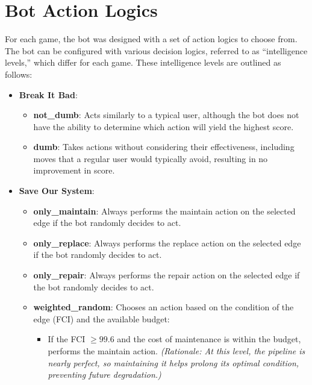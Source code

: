 \documentclass[12pt,a4paper]{report}
\begin{document}
    \section{Bot Action Logics}
    \label{sec:bot-action-logics}
        For each game, the bot was designed with a set of action logics to choose from. The bot can be configured with various decision logics, referred to as “intelligence levels,” which differ for each game. These intelligence levels are outlined as follows:
        
        \begin{itemize}
            \item \textbf{Break It Bad}:
            \begin{itemize}
                \item \textbf{not\_dumb}: Acts similarly to a typical user, although the bot does not have the ability to determine which action will yield the highest score.
                \item \textbf{dumb}: Takes actions without considering their effectiveness, including moves that a regular user would typically avoid, resulting in no improvement in score.
            \end{itemize}
            
            \item \textbf{Save Our System}:
            \begin{itemize}
                \item \textbf{only\_maintain}: Always performs the maintain action on the selected edge if the bot randomly decides to act.
                \item \textbf{only\_replace}: Always performs the replace action on the selected edge if the bot randomly decides to act.
                \item \textbf{only\_repair}: Always performs the repair action on the selected edge if the bot randomly decides to act.
                \item \textbf{weighted\_random}: Chooses an action based on the condition of the edge (FCI) and the available budget:
                \begin{itemize}
                    \item If the FCI $\geq 99.6$ and the cost of maintenance is within the budget, performs the maintain action.
                    \textit{(Rationale: At this level, the pipeline is nearly perfect, so maintaining it helps prolong its optimal condition, preventing future degradation.)}


\end{itemize}
\end{itemize}
\end{itemize}
\end{document}
